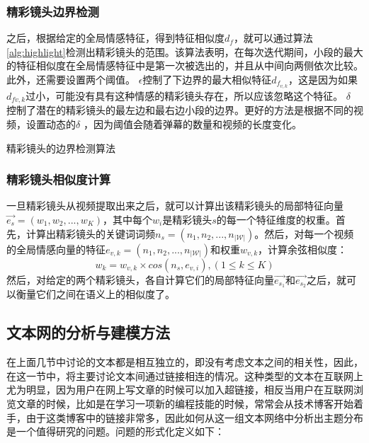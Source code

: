 \subsubsection{精彩镜头边界检测}
之后，根据给定的全局情感特征，得到特征相似度$d_f$，就可以通过算法\ref{alg:highlight}检测出精彩镜头的范围。该算法表明，在每次迭代期间，小段的最大的特征相似度在全局情感特征中是第一次被选出的，并且从中间向两侧依次比较。此外，还需要设置两个阈值。 $\epsilon$控制了下边界的最大相似特征$d_{f_{v,k}}$，这是因为如果$d_{f{v,k}}$过小，可能没有具有这种情感的精彩镜头存在，所以应该忽略这个特征。 $\delta$ 控制了潜在的精彩镜头的最左边和最右边小段的边界。更好的方法是根据不同的视频，设置动态的$\delta$ ，因为阈值会随着弹幕的数量和视频的长度变化。
\begin{algorithm}
\caption{精彩镜头的边界检测算法}
\label{alg:highlight}
\end{algorithm}

\subsubsection{精彩镜头相似度计算}
一旦精彩镜头从视频提取出来之后，就可以计算出该精彩镜头的局部特征向量$\vec{e_s}=(w_1, w_2,..., w_K)$，其中每个$w_i$是精彩镜头$s$的每一个特征维度的权重。首先，计算出精彩镜头的关键词词频$n_s=(n_1, n_2,..., n_{|\mathcal{W}|})$。然后，对每一个视频的全局情感向量的特征$e_{v,k}=(n_1, n_2,...,n_{|\mathcal{W}|})$和权重$w_{v,k}$，计算余弦相似度：
\begin{equation}
  w_k=w_{v,k}\times cos(n_s, e_{v,i}), (1\le k\le K)
\end{equation}
然后，对给定的两个精彩镜头，各自计算它们的局部特征向量$\vec{e_{s_1}}$和$\vec{e_{s_2}}$之后，就可以衡量它们之间在语义上的相似度了。

\subsection{文本网的分析与建模方法}
在上面几节中讨论的文本都是相互独立的，即没有考虑文本之间的相关性，因此，在这一节中，将主要讨论文本间通过链接相连的情况。这种类型的文本在互联网上尤为明显，因为用户在网上写文章的时候可以加入超链接，相反当用户在互联网浏览文章的时候，比如是在学习一项新的编程技能的时候，常常会从技术博客开始着手，由于这类博客中的链接非常多，因此如何从这一组文本网络中分析出主题分布是一个值得研究的问题。问题的形式化定义如下：

